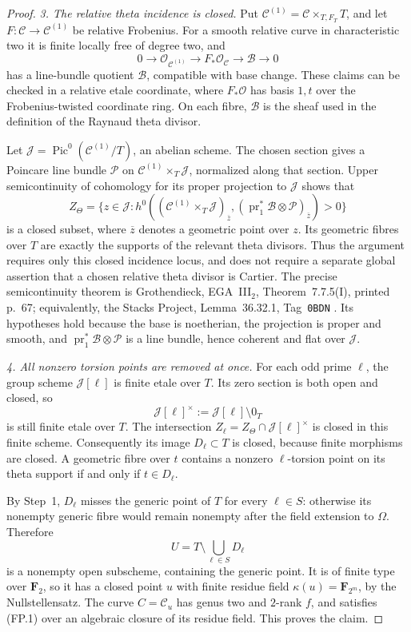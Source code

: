 \documentclass[11pt,a4paper]{article}
\begin{document}
\begin{proof}
\emph{3. The relative theta incidence is closed.}
Put $\mathcal C^{(1)}=\mathcal C\times_{T,F_T}T$, and let
$F:\mathcal C\to\mathcal C^{(1)}$ be relative Frobenius.
For a smooth relative curve in characteristic two it is finite locally
free of degree two, and
\[
 0\longrightarrow\mathcal O_{\mathcal C^{(1)}}
 \longrightarrow F_*\mathcal O_{\mathcal C}
 \longrightarrow\mathcal B\longrightarrow0
 \tag{FP.2}
\]
has a line-bundle quotient $\mathcal B$, compatible with base change.
These claims can be checked in a relative etale coordinate, where
$F_*\mathcal O$ has basis $1,t$ over the Frobenius-twisted coordinate
ring.  On each fibre, $\mathcal B$ is the sheaf used in the definition
of the Raynaud theta divisor.

Let $\mathcal J=\operatorname{Pic}^0(\mathcal C^{(1)}/T)$, an abelian
scheme.  The chosen section gives a Poincare line bundle $\mathcal P$
on $\mathcal C^{(1)}\times_T\mathcal J$, normalized along that section.
Upper semicontinuity of cohomology for its proper projection to
$\mathcal J$ shows that
\[
 Z_\Theta=
 \{z\in\mathcal J:
 h^0((\mathcal C^{(1)}\times_T\mathcal J)_{\overline z},
       (\operatorname{pr}_1^*\mathcal B\otimes\mathcal P)_{\overline z})>0\}
 \tag{FP.3}
\]
is a closed subset, where $\overline z$ denotes a geometric point
over $z$.  Its geometric fibres over $T$ are
exactly the supports of the relevant theta divisors.  Thus the
argument requires only this closed incidence locus, and does not
require a separate global assertion that a chosen relative theta
divisor is Cartier.  The precise semicontinuity theorem is
Grothendieck, EGA~III$_2$, Theorem~7.7.5(I), printed p.~67;
equivalently, the Stacks Project, Lemma~36.32.1, Tag~\texttt{0BDN} \cite{EGAIII2,Stacks}.
Its hypotheses hold because the base is noetherian, the projection
is proper and smooth, and
$\operatorname{pr}_1^*\mathcal B\otimes\mathcal P$ is a line bundle,
hence coherent and flat over $\mathcal J$.

\emph{4. All nonzero torsion points are removed at once.}
For each odd prime $\ell$, the group scheme $\mathcal J[\ell]$ is
finite etale over $T$.  Its zero section is both open and closed, so
\[
 \mathcal J[\ell]^\times:=\mathcal J[\ell]\setminus0_T
\]
is still finite etale over $T$.  The intersection
$Z_\ell=Z_\Theta\cap\mathcal J[\ell]^\times$ is closed in this finite
scheme.  Consequently its image $D_\ell\subset T$ is closed, because
finite morphisms are closed.  A geometric fibre over $t$ contains a
nonzero $\ell$-torsion point on its theta support if and only if
$t\in D_\ell$.

By Step~1, $D_\ell$ misses the generic point of $T$ for every
$\ell\in S$: otherwise its nonempty generic fibre would remain
nonempty after the field extension to $\Omega$.  Therefore
\[
 U=T\setminus\bigcup_{\ell\in S}D_\ell
\]
is a nonempty open subscheme, containing the generic point.
It is of finite type over $\mathbf F_2$, so it has a closed point $u$
with finite residue field $\kappa(u)=\mathbf F_{2^m}$, by the
Nullstellensatz.  The curve $C=\mathcal C_u$ has genus two and
$2$-rank $f$, and satisfies (FP.1) over an algebraic closure of its
residue field.  This proves the claim.
\end{proof}
\end{document}
